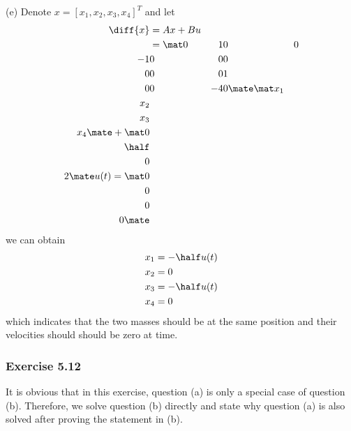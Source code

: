 (e) Denote $x = [x_1,x_2,x_3,x_4]^T$ and let
\begin{equation}
    \begin{aligned}
        \diff{x} &= Ax + Bu \\
        &= \mat 0 &1 &0 &0 \\ -1 &0 &0 &0 \\ 0 &0 &0 &1 \\ 0 &0 &-4 &0 \mate \mat x_1 \\ x_2 \\ x_3 \\ x_4 \mate + \mat 0 \\ \half \\ 0 \\ 2 \mate u(t) = \mat 0 \\ 0 \\ 0 \\ 0 \mate
    \end{aligned}
\end{equation}
we can obtain
\begin{equation}
    \begin{aligned}
        x_1 &= -\half u(t) \\
        x_2 &= 0 \\
        x_3 &= -\half u(t) \\
        x_4 &= 0
    \end{aligned}
\end{equation}
which indicates that the two masses should be at the same position and their velocities should should be zero at time.


\subsubsection{Exercise 5.12}
It is obvious that in this exercise, question (a) is only a special case of question (b). Therefore, we solve question (b) directly and state why question (a) is also solved after proving the statement in (b).

